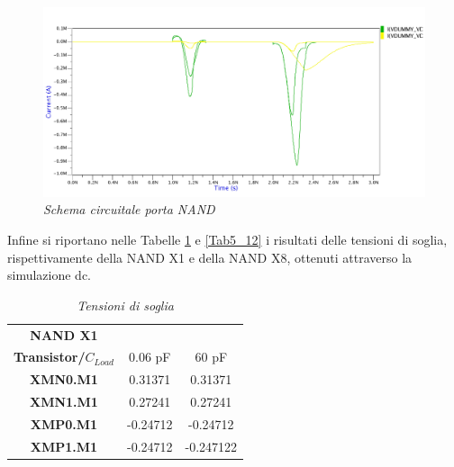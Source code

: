 \begin{figure}[!htb]
	\centering
	\includegraphics[scale=0.12]{immagini/onde_5_3_current3}
	\caption{\textit{Schema circuitale porta NAND}}
	\label{onde_5_3_current3}
\end{figure}
\newpage
\noindent Infine si riportano nelle Tabelle \ref{Tab5_11} e \ref{Tab5_12} i risultati delle tensioni di soglia, rispettivamente della NAND X1 e della NAND X8, ottenuti attraverso la simulazione dc.
\begin{table}[!h]\footnotesize
	\centering
	\begin{tabular}{|c|c|c|}
		\hline
		\textbf{NAND X1} &&\\
		
		\textbf{Transistor/$C_{Load}$}&0.06 pF & 60 pF\\
		\hline
		\textbf{XMN0.M1} &0.31371&0.31371\\
		
		\textbf{XMN1.M1} &0.27241&0.27241 \\
		
		\textbf{XMP0.M1}&-0.24712&-0.24712 \\
		
		\textbf{XMP1.M1}&-0.24712&-0.247122\\
		
		\hline
	\end{tabular}
	\caption{\textit{Tensioni di soglia}}
	\label{Tab5_11}
\end{table}
